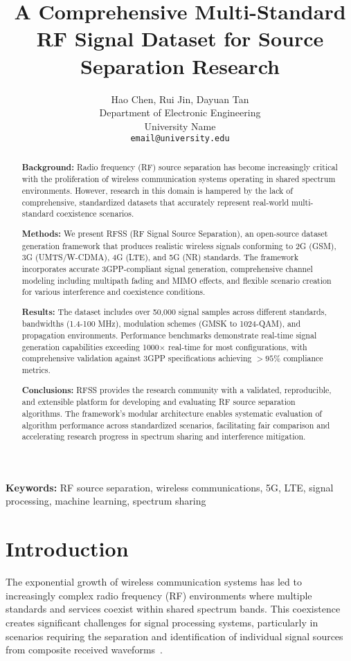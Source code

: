 \documentclass[twocolumn,10pt]{article}
\title{\LARGE \bf A Comprehensive Multi-Standard RF Signal Dataset for Source Separation Research}
\author{
Hao Chen, Rui Jin, Dayuan Tan\\
Department of Electronic Engineering\\
University Name\\
\texttt{email@university.edu}
}
\date{}
\begin{document}
\maketitle

\begin{abstract}
\textbf{Background:} Radio frequency (RF) source separation has become increasingly critical with the proliferation of wireless communication systems operating in shared spectrum environments. However, research in this domain is hampered by the lack of comprehensive, standardized datasets that accurately represent real-world multi-standard coexistence scenarios.

\textbf{Methods:} We present RFSS (RF Signal Source Separation), an open-source dataset generation framework that produces realistic wireless signals conforming to 2G (GSM), 3G (UMTS/W-CDMA), 4G (LTE), and 5G (NR) standards. The framework incorporates accurate 3GPP-compliant signal generation, comprehensive channel modeling including multipath fading and MIMO effects, and flexible scenario creation for various interference and coexistence conditions.

\textbf{Results:} The dataset includes over 50,000 signal samples across different standards, bandwidths (1.4-100 MHz), modulation schemes (GMSK to 1024-QAM), and propagation environments. Performance benchmarks demonstrate real-time signal generation capabilities exceeding 1000$\times$ real-time for most configurations, with comprehensive validation against 3GPP specifications achieving $>95\%$ compliance metrics.

\textbf{Conclusions:} RFSS provides the research community with a validated, reproducible, and extensible platform for developing and evaluating RF source separation algorithms. The framework's modular architecture enables systematic evaluation of algorithm performance across standardized scenarios, facilitating fair comparison and accelerating research progress in spectrum sharing and interference mitigation.
\end{abstract}

\textbf{Keywords:} RF source separation, wireless communications, 5G, LTE, signal processing, machine learning, spectrum sharing

\section{Introduction}

The exponential growth of wireless communication systems has led to increasingly complex radio frequency (RF) environments where multiple standards and services coexist within shared spectrum bands. This coexistence creates significant challenges for signal processing systems, particularly in scenarios requiring the separation and identification of individual signal sources from composite received waveforms~\cite{cabric2004implementation, mitola1999cognitive}.
\end{document}
